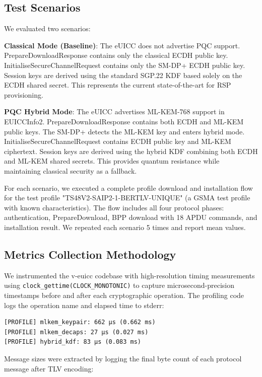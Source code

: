 \documentclass{easychair}
\begin{document}
\subsection{Test Scenarios}

We evaluated two scenarios:

\textbf{Classical Mode (Baseline)}: The eUICC does not advertise PQC support. PrepareDownloadResponse contains only the classical ECDH public key. InitialiseSecureChannelRequest contains only the SM-DP+ ECDH public key. Session keys are derived using the standard SGP.22 KDF based solely on the ECDH shared secret. This represents the current state-of-the-art for RSP provisioning.

\textbf{PQC Hybrid Mode}: The eUICC advertises ML-KEM-768 support in EUICCInfo2. PrepareDownloadResponse contains both ECDH and ML-KEM public keys. The SM-DP+ detects the ML-KEM key and enters hybrid mode. InitialiseSecureChannelRequest contains ECDH public key and ML-KEM ciphertext. Session keys are derived using the hybrid KDF combining both ECDH and ML-KEM shared secrets. This provides quantum resistance while maintaining classical security as a fallback.

For each scenario, we executed a complete profile download and installation flow for the test profile "TS48V2-SAIP2-1-BERTLV-UNIQUE" (a GSMA test profile with known characteristics). The flow includes all four protocol phases: authentication, PrepareDownload, BPP download with 18 APDU commands, and installation result. We repeated each scenario 5 times and report mean values.

\subsection{Metrics Collection Methodology}

We instrumented the v-euicc codebase with high-resolution timing measurements using \texttt{clock\_gettime(CLOCK\_MONOTONIC)} to capture microsecond-precision timestamps before and after each cryptographic operation. The profiling code logs the operation name and elapsed time to stderr:

\begin{verbatim}
[PROFILE] mlkem_keypair: 662 µs (0.662 ms)
[PROFILE] mlkem_decaps: 27 µs (0.027 ms)
[PROFILE] hybrid_kdf: 83 µs (0.083 ms)
\end{verbatim}

Message sizes were extracted by logging the final byte count of each protocol message after TLV encoding:
\end{document}
